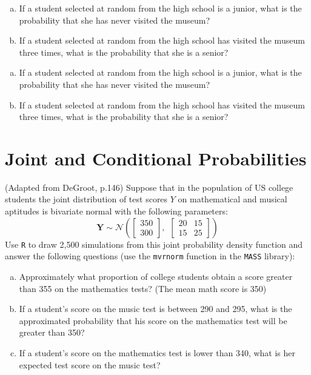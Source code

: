 \documentclass[12pt,letterpaper]{article}
\begin{document}
\begin{enumerate}[(a)]
	\item If a student selected at random from the high school is a junior, what is the probability that she has never visited the museum? 
	\item If a student selected at random from the high school has visited the museum three times, what is the probability that she is a senior? 
\end{enumerate}

\begin{enumerate}[(a)]
	\item If a student selected at random from the high school is a junior, what is the probability that she has never visited the museum?
	
	
	\item If a student selected at random from the high school has visited the museum three times, what is the probability that she is a senior?
	
	
\end{enumerate}


\section{Joint and Conditional Probabilities}

(Adapted from DeGroot, p.146) Suppose that in the population of US college students the joint distribution of test scores $Y$ on mathematical and musical aptitudes is bivariate normal with the following parameters:
\[
\mathbf{Y} \sim \mathcal{N}\left( 
\begin{bmatrix}    350  \\     300 \end{bmatrix},~~
\begin{bmatrix} 20 & 15 \\ 15 & 25 \end{bmatrix}
\right)
\]
Use \texttt{R} to draw 2,500 simulations from this joint probability density function and answer the following questions (use the \texttt{mvrnorm} function in the \texttt{MASS} library):

\begin{enumerate}[(a)]
	\item Approximately what proportion of college students obtain a score greater than 355 on the mathematics tests? (The mean math score is 350) 
	\item If a student's score on the music test is between 290 and 295, what is the approximated probability that his score on the mathematics test will be greater than 350? 
	\item If a student's score on the mathematics test is lower than 340, what is her expected test score on the music test? 
\end{enumerate}
\end{document}
